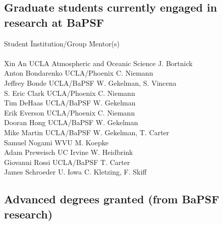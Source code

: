 \documentclass[11pt]{article}
\date{}
\title{}
\begin{document}
\subsection{Graduate students currently engaged in research at BaPSF}

\begin{tabbing}
Student \hspace{0.8in} \=  Institution/Group \hspace{2.1in} \= Mentor(s) \\
\\
Xin An \> UCLA Atmospheric and Oceanic Science \> J. Bortnick\\
Anton Bondarenko \> UCLA/Phoenix \> C. Niemann\\
Jeffrey Bonde \> UCLA/BaPSF \> W. Gekelman, S. Vincena \\
S. Eric Clark \> UCLA/Phoenix \> C. Niemann\\
Tim DeHaas \> UCLA/BaPSF \> W. Gekelman \\
Erik Everson \> UCLA/Phoenix \> C. Niemann\\
Dooran Hong \> UCLA/BaPSF \> W. Gekelman\\
Mike Martin \> UCLA/BaPSF \> W. Gekelman, T. Carter \\
Samuel Nogami \> WVU \> M. Koepke \\
Adam Preweisch \> UC Irvine \> W. Heidbrink\\
Giovanni Rossi \> UCLA/BaPSF \> T. Carter \\
James Schroeder \> U. Iowa \> C. Kletzing, F. Skiff\\
\end{tabbing}


\subsection{Advanced degrees granted (from BaPSF research)}
\end{document}

